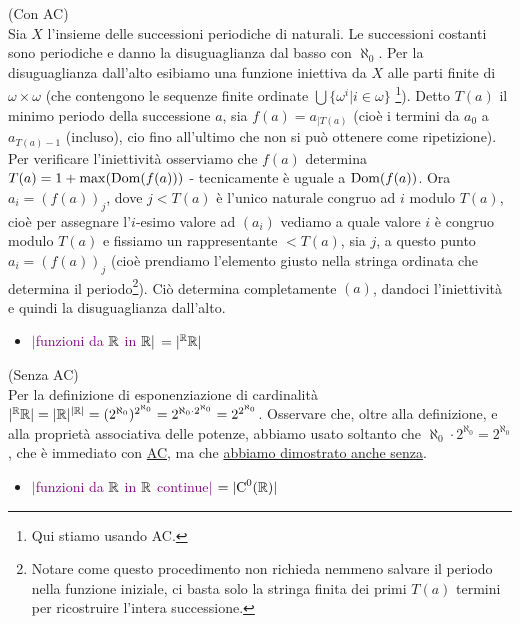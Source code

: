 \begin{soln}
	(Con AC)\\
	Sia $X$ l'insieme delle successioni periodiche di naturali. Le successioni costanti sono periodiche e danno la disuguaglianza dal basso con $\aleph_0$. Per la disuguaglianza dall'alto esibiamo una funzione iniettiva da $X$ alle parti finite di $\omega \times \omega$ (che contengono le sequenze finite ordinate $\bigcup\{\omega^i |i \in \omega\}$ \footnote{Qui stiamo usando AC.}).
	Detto $T(a)$ il minimo periodo della successione $a$, sia $f(a) = a_{|T(a)}$ (cio\`e i termini da $a_0$ a $a_{T(a)-1}$ (incluso), cio fino all'ultimo che non si pu\`o ottenere come ripetizione).\\
	Per verificare l'iniettivit\`a osserviamo che $f(a)$ determina $T(a) = 1 + \max(\operatorname{Dom}(f(a)))$ - tecnicamente \`e uguale a $\operatorname{Dom}(f(a))$. Ora $a_i = (f(a))_j$, dove $j < T(a)$ \`e l'unico naturale congruo ad $i$ modulo $T(a)$, cio\`e per assegnare l'$i$-esimo valore ad $(a_i)$ vediamo a quale valore $i$ \`e congruo modulo $T(a)$ e fissiamo un rappresentante $<T(a)$, sia $j$, a questo punto
	$a_i = (f(a))_j$ (cio\`e prendiamo l'elemento giusto nella stringa ordinata che determina il periodo\footnote{Notare come questo procedimento non richieda nemmeno salvare il periodo nella funzione iniziale, ci basta solo la stringa finita dei primi $T(a)$ termini per ricostruire l'intera successione.}).
    Ci\`o determina completamente $(a)$, dandoci l'iniettivit\`a e quindi la disuguaglianza dall'alto.
\end{soln}

\begin{itemize}
	\item \textcolor{purple}{$|$funzioni da $\mathbb R$ in $\mathbb R|$ $= |{}^\mathbb R\mathbb R|$}
\end{itemize}

\begin{soln}
	(Senza AC)\\
	Per la definizione di esponenziazione di cardinalit\`a $|{}^\mathbb R\mathbb R| = |\mathbb R|^{|\mathbb R|} = (2^{\aleph_0})^{2^{\aleph_0}} = 2^{\aleph_0 \cdot 2^{\aleph_0}} = 2^{2^{\aleph_0}}$. Osservare che, oltre alla definizione,
	e alla propriet\`a associativa delle potenze, abbiamo usato soltanto che $\aleph_0 \cdot 2^{\aleph_0} = 2^{\aleph_0}$, che \`e immediato con \hyperref[ax9]{AC}, ma che \hyperref[prodotto_cardinali_senza_AC]{abbiamo dimostrato anche senza}.
\end{soln}

\begin{itemize}
	\item \textcolor{purple}{$|$funzioni da $\mathbb R$ in $\mathbb R$ continue$|$ $= |\text{C}^0(\mathbb R)|$}
\end{itemize}


